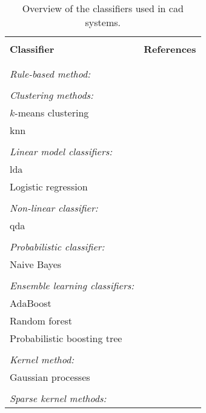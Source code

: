 \begin{table}
  \caption{Overview of the classifiers used in \ac{cad} systems.}\label{tab:class}
  \small
  \renewcommand{\arraystretch}{.8}
  \begin{tabular}{p{.60\linewidth} p{.30\linewidth}}
    \hline \\ [-1.5ex]
    \textbf{Classifier} & \textbf{References} \\ \\ [-1.5ex]
    \hline \\ [-1.5ex]
    \textit{Rule-based method:} & \cite{Lv2009,Puech2009} \\ \\ [-1.5ex]
    \textit{Clustering methods:} & \\
    \quad $k$-means clustering & \cite{Tiwari2007,Tiwari2008,Tiwari2009} \\
    \quad \acs{knn} & \cite{Litjens2012,Niaf2011,Niaf2012} \\ \\ [-1.5ex]
    \textit{Linear model classifiers:} & \\
    \quad \acs{lda} & \cite{Antic2013,Chan2003,Litjens2014,Niaf2011,Niaf2012,Vos2012} \\
    \quad Logistic regression & \cite{Kelm2007,Langer2009} \\ \\ [-1.5ex]
    \textit{Non-linear classifier:} & \\
    \quad \acs{qda} & \cite{Viswanath2012} \\ \\ [-1.5ex]
    \textit{Probabilistic classifier:} & \\
    \quad Naive Bayes & \cite{Giannini2013,Mazzetti2011,Niaf2011,Niaf2012} \\ \\ [-1.5ex]
    \textit{Ensemble learning classifiers:} & \\
    \quad AdaBoost & \cite{Litjens2014,Lopes2011} \\
    \quad Random forest & \cite{Kelm2007,Litjens2014,Tiwari2012,Tiwari2013,Viswanath2009} \\
    \quad Probabilistic boosting tree & \cite{Tiwari2009,Tiwari2010,Tiwari2012} \\ \\ [-1.5ex]
    \textit{Kernel method:} & \\
    \quad Gaussian processes & \cite{Kelm2007} \\ \\ [-1.5ex]
    \textit{Sparse kernel methods:} & \\

\end{tabular}
\end{table}
